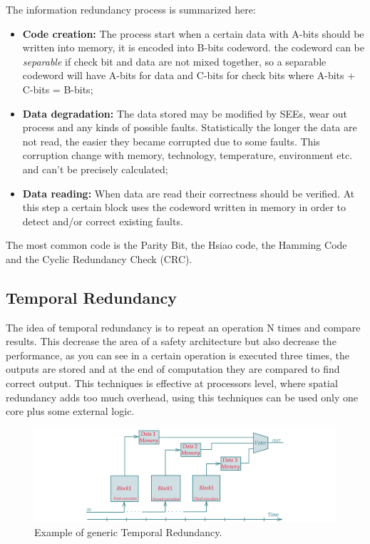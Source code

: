 {{{		    The information redundancy process is summarized here:
		    \begin{itemize}
		        \item \textbf{Code creation:} The process start when a certain data with A-bits should be written into memory, it is encoded into B-bits codeword. the codeword can be \textit{separable} if check bit and data are not mixed together, so a separable codeword will have A-bits for data and C-bits for check bits where A-bits + C-bits = B-bits;
		        \item \textbf{Data degradation:} The data stored may be modified by SEEs, wear out process and any kinds of possible faults. Statistically the longer the data are not read, the easier they became corrupted due to some faults. This corruption change with memory, technology, temperature, environment etc. and can't be precisely calculated;
		        \item \textbf{Data reading:} When data are read their correctness should be verified. At this step a certain block uses the codeword written in memory in order to detect and/or correct existing faults.
		    \end{itemize}
		    
		    The most common code is the Parity Bit, the Hsiao code, the Hamming Code and the Cyclic Redundancy Check (CRC). 
		}
		\subsection{Temporal Redundancy}{
			The idea of temporal redundancy is to repeat an operation N times and compare results. 
			This decrease the area of a safety architecture but also decrease the performance, as you can see in  a certain operation is executed three times, the outputs are stored and at the end of computation they are compared to find correct output. 
			This techniques is effective at processors level, where spatial redundancy adds too much overhead, using this techniques can be used only one core plus some external logic.\\
			
			\begin{figure}[H]
    			\centering
    			\includegraphics[scale=0.2,center]{./images/TimeRedundancy1.png}
    			\caption{Example of generic Temporal Redundancy.}
    			\label{fig:TemporalRedundancy1}
    		\end{figure} 
    		
}}}
